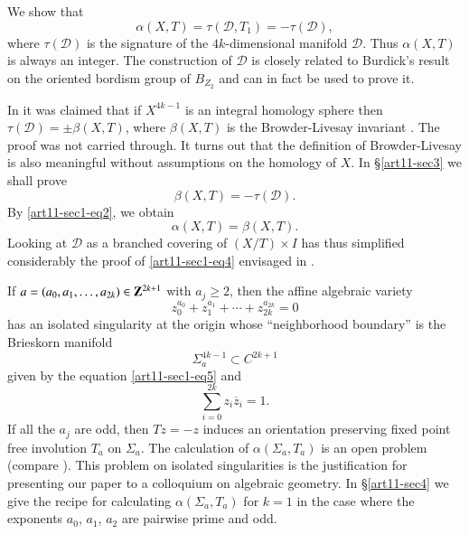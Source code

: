 We show that
$$
\alpha(X,T)=\tau(\mathscr{D},T_{1})=-\tau(\mathscr{D}),
$$\pageoriginale
where $\tau(\mathscr{D})$ is the signature of the $4k$-dimensional manifold $\mathscr{D}$. Thus $\alpha(X,T)$ is always an integer. The construction of $\mathscr{D}$ is closely related to Burdick's result on the oriented bordism group of $B_{Z_{2}}$ and can in fact be used to prove it.

In \cite{art11-key7} it was claimed that if $X^{4k-1}$ is an integral homology sphere then $\tau(\mathscr{D})=\pm \beta(X,T)$, where $\beta(X,T)$ is the Browder-Livesay invariant \cite{art11-key3}. The proof was not carried through. It turns out that the definition of Browder-Livesay is also meaningful without assumptions on the homology of $X$. In \S\ref{art11-sec3} we shall prove
\setcounter{equation}{2}
\begin{equation}
\beta(X,T)=-\tau(\mathscr{D}).\label{art11-sec1-eq3}
\end{equation}
By \eqref{art11-sec1-eq2}, we obtain
\begin{equation}
\alpha(X,T)=\beta(X,T).\label{art11-sec1-eq4}
\end{equation}
Looking at $\mathscr{D}$ as a branched covering of $(X/T)\times I$ has thus simplified considerably the proof of \eqref{art11-sec1-eq4} envisaged in \cite{art11-key7}.

If $a=(a_{0},a_{1},\ldots,a_{2k})\in \mathbf{Z}^{2k+1}$ with $a_{j}\geq 2$, then the affine algebraic variety
\begin{equation}
z^{a_{0}}_{0}+z^{a_{1}}_{1}+\cdots+z^{a_{2k}}_{2k}=0\label{art11-sec1-eq5}
\end{equation}
has an isolated singularity at the origin whose ``neighborhood boundary'' is the Brieskorn manifold \cite{art11-key1}
$$
\Sigma^{4k-1}_{a}\subset C^{2k+1}
$$
given by the equation \eqref{art11-sec1-eq5} and 
\begin{equation}
\sum\limits^{2k}_{i=0}z_{i}\overline{z}_{i}=1.\label{art11-sec1-eq6}
\end{equation}
If all the $a_{j}$ are odd, then $Tz=-z$ induces an orientation preserving fixed point free involution $T_{a}$ on $\Sigma_{a}$. The calculation of $\alpha(\Sigma_{a},T_{a})$ is an open problem (compare \cite{art11-key7}). This problem on isolated singularities is the justification for presenting our paper to a colloquium on algebraic geometry. In \S\ref{art11-sec4} we give the recipe for calculating $\alpha(\Sigma_{a},T_{a})$ for $k=1$ in the case where the exponents $a_{0}$, $a_{1}$, $a_{2}$ are pairwise prime and odd.

